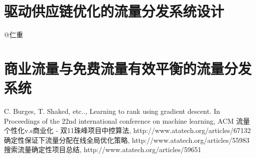\section{驱动供应链优化的流量分发系统设计} 
@仁重

\section{商业流量与免费流量有效平衡的流量分发系统} 


\begin{thebibliography}{99}
 C. Burges, T. Shaked, etc.., Learning to rank 
using gradient descent. In Proceedings of the 22nd international 
conference on machine learning, ACM
 流量个性化v.s商业化 - 双11珠峰项目中控算法, http://www.atatech.org/articles/67132
 确定性保证下流量分配在线全局优化策略, http://www.atatech.org/articles/55983
 搜索流量确定性项目总结, http://www.atatech.org/articles/59651
\end{thebibliography}

 
